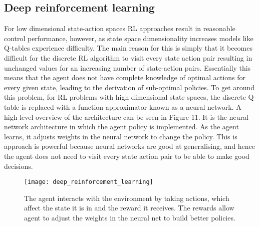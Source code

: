 \subsection{Deep reinforcement learning}
For low dimensional state-action spaces RL approaches result in reasonable control performance, however, as state space dimensionality increases models like Q-tables experience difficulty. The main reason for this is simply that it becomes difficult for the discrete RL algorithm to visit every state action pair resulting in unchanged values for an increasing number of state-action pairs. Essentially this means that the agent does not have complete knowledge of optimal actions for every given state, leading to the derivation of sub-optimal policies. To get around this problem, for RL problems with high dimensional state spaces, the discrete Q-table is replaced with a function approximator known as a neural network. A high level overview of the architecture can be seen in Figure 11. It is the neural network architecture in which the agent policy is implemented. As the agent learns, it adjusts weights in the neural network to change the policy. This is approach is powerful because neural networks are good at generalising, and hence the agent does not need to visit every state action pair to be able to make good decisions.
\begin{figure}[ht]
\centering
\texttt{[image: deep\_reinforcement\_learning]}
\caption{The agent interacts with the environment by taking actions, which affect the state it is in and the reward it receives. The rewards allow agent to adjust the weights in the neural net to build better policies.}
\end{figure}